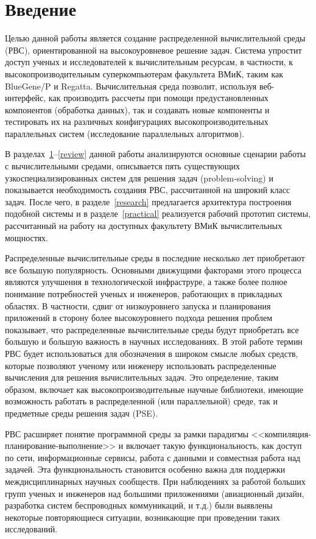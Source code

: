 \section{Введение} 
\label{intro}

Целью данной работы является создание распределенной вычислительной среды (РВС), ориентированной на высокоуровневое решение задач. Система упростит доступ ученых и исследователей к вычислительным ресурсам, в частности, к высокопроизводительным суперкомпьютерам факультета ВМиК, таким как BlueGene/P и Regatta. Вычислительная среда позволит, используя веб-интерфейс, как производить рассчеты при помощи предустановленных компонентов (обработка данных), так и создавать новые компоненты и тестировать их на различных конфигурациях высокопроизводительных параллельных систем (исследование параллельных алгоритмов).

В разделах~\ref{intro}--\ref{review} данной работы анализируются основные сценарии работы с вычислительными средами, описывается пять существующих узкоспециализированных систем для решения задач (problem-solving) и показывается необходимость создания РВС, рассчитанной на широкий класс задач. После чего, в разделе~\ref{research} предлагается архитектура построения подобной системы и в разделе~\ref{practical} реализуется рабочий прототип системы, рассчитанный на работу на доступных факультету ВМиК вычислительных мощностях.

Распределенные вычислительные среды  в последние несколько лет приобретают все большую популярность. Основными движущими факторами этого процесса являются улучшения в технологической инфраструре, а также более полное понимание потребностей ученых и инженеров, работающих в прикладных областях. В частности, сдвиг от низкоуровнего запуска и планирования приложений в сторону более высокоуровнего подхода решения проблем показывает, что распределенные вычислительные среды будут приобретать все большую и большую важность в научных исследованиях. В этой работе термин РВС будет использоваться для обозначения в широком смысле любых средств, которые позволяют ученому или инженеру использовать распределенные вычисления для решения вычислительных задач. Это определение, таким образом, включает как высокопроизводительные научные библиотеки, имеющие возможность работать в распределенной (или параллельной) среде, так и предметные среды решения задач (PSE).

РВС расширяет понятие программной среды за рамки парадигмы <<компиляция-планирование-выполнение>> и включает такую функциональность, как доступ по сети, информационные сервисы, работа с данными и совместная работа над задачей. Эта функциональность становится особенно важна для поддержки междисциплинарных научных сообществ. При наблюдениях за работой больших групп ученых и инженеров над большими приложениями (авиационный дизайн, разработка систем беспроводных коммуникаций, и т.д.) были выявлены некоторые \cite{Ramakrishnan02} повторяющиеся ситуации, возникающие при проведении таких исследований.

